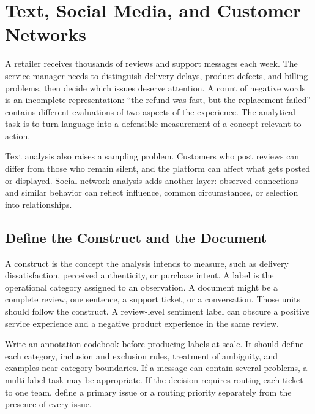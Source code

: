\hypertarget{M05-m5.-text-social-media-and-customer-networks}{%
\chapter{Text, Social Media, and Customer
Networks}\label{M05-m5.-text-social-media-and-customer-networks}}

\noindent A retailer receives thousands of reviews and support messages each week.
The service manager needs to distinguish delivery delays, product
defects, and billing problems, then decide which issues deserve
attention. A count of negative words is an incomplete representation:
``the refund was fast, but the replacement failed'' contains different
evaluations of two aspects of the experience. The analytical task is to
turn language into a defensible measurement of a concept relevant to
action.

Text analysis also raises a sampling problem. Customers who post reviews
can differ from those who remain silent, and the platform can affect
what gets posted or displayed. Social-network analysis adds another
layer: observed connections and similar behavior can reflect influence,
common circumstances, or selection into relationships.

\hypertarget{M05-define-the-construct-and-the-document}{%
\section{Define the Construct and the
Document}\label{M05-define-the-construct-and-the-document}}

\noindent A construct is the concept the analysis intends to measure, such as
delivery dissatisfaction, perceived authenticity, or purchase intent. A
label is the operational category assigned to an observation. A document
might be a complete review, one sentence, a support ticket, or a
conversation. Those units should follow the construct. A review-level
sentiment label can obscure a positive service experience and a negative
product experience in the same review.

Write an annotation codebook before producing labels at scale. It should
define each category, inclusion and exclusion rules, treatment of
ambiguity, and examples near category boundaries. If a message can
contain several problems, a multi-label task may be appropriate. If the
decision requires routing each ticket to one team, define a primary
issue or a routing priority separately from the presence of every issue.

